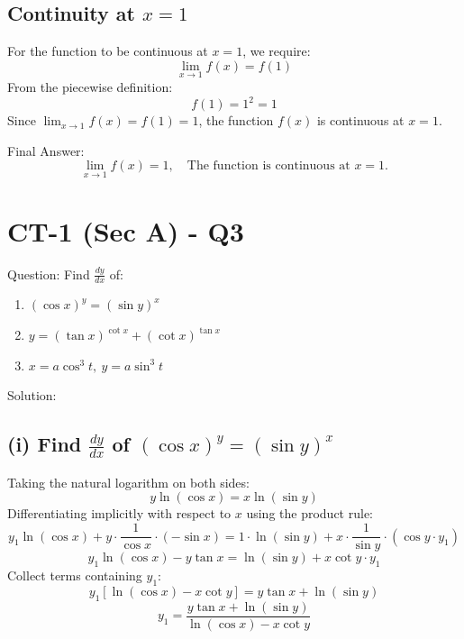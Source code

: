 \documentclass[11pt, a4paper]{article}
\begin{document}
\subsection*{Continuity at $x = 1$}
For the function to be continuous at $x = 1$, we require:
\[ \lim_{x \to 1} f(x) = f(1) \]
From the piecewise definition:
\[ f(1) = 1^2 = 1 \]
Since $\lim_{x \to 1} f(x) = f(1) = 1$, the function $f(x)$ is continuous at $x = 1$.

Final Answer:
\[ 
\boxed{\lim_{x \to 1} f(x) = 1, \quad \text{The function is continuous at } x = 1.} 
\]



\section*{CT-1 (Sec A) - Q3}

Question:
Find $\frac{dy}{dx}$ of:
\begin{enumerate}[label=(\roman*)]
    \item $(\cos x)^y = (\sin y)^x$
    \item $y = (\tan x)^{\cot x} + (\cot x)^{\tan x}$
    \item $x = a\cos^3 t, \ y = a\sin^3 t$
\end{enumerate}

Solution:

\subsection*{(i) Find $\frac{dy}{dx}$ of $(\cos x)^y = (\sin y)^x$}
Taking the natural logarithm on both sides:
\[ y \ln(\cos x) = x \ln(\sin y) \]
Differentiating implicitly with respect to $x$ using the product rule:
\[ y_1 \ln(\cos x) + y \cdot \frac{1}{\cos x} \cdot (-\sin x) = 1 \cdot \ln(\sin y) + x \cdot \frac{1}{\sin y} \cdot (\cos y \cdot y_1) \]
\[ y_1 \ln(\cos x) - y \tan x = \ln(\sin y) + x \cot y \cdot y_1 \]
Collect terms containing $y_1$:
\[ y_1 \left[ \ln(\cos x) - x \cot y \right] = y \tan x + \ln(\sin y) \]
\[ y_1 = \frac{y \tan x + \ln(\sin y)}{\ln(\cos x) - x \cot y} \]
\end{document}
